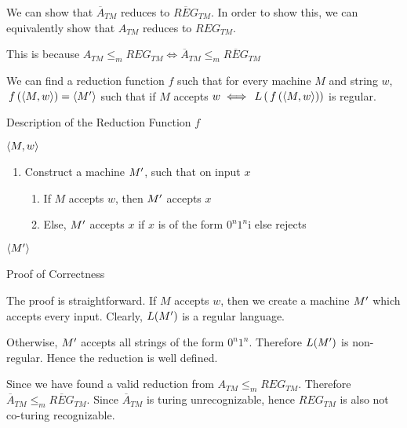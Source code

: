 \documentclass{article}
\begin{document}
\begin{question}

	We can show that $\overline{A}_{TM}$ reduces to $\overline{REG}_{TM}$. In order to show this, we can equivalently show that $A_{TM}$ reduces to $REG_{TM}$. \br%

	This is because $A_{TM} \le _m REG_{TM} \iff \overline{A}_{TM} \le _m \overline{REG}_{TM}$ \br%

	We can find a reduction function $f$ such that for every machine $M$ and string $w$, $\func{f}{\angl{M, w}} = \angl{\pr{M}}$ such that if $M$ accepts $w \iff \func{L}{\func{f}{\angl{M, w}}}$ is regular.

	\begin{qsubsection}{Description of the Reduction Function $f$}

		 $\left\langle M, w \right\rangle$
		\begin{enumerate}[label = (\alph*) ]
			\item Construct a machine $M^{\prime}$, such that on input $x$
				\begin{enumerate}[label = (\roman*)]
					\item If $M$ accepts $w$, then $M^{\prime}$ accepts $x$
					\item Else, $M^{\prime}$ accepts $x$ if $x$ is of the form $0^n 1^n$i else rejects
				\end{enumerate}
		\end{enumerate}
		 $\left\langle M^{\prime} \right\rangle$

	\end{qsubsection}

	\begin{qsubsection}{Proof of Correctness}

		The proof is straightforward. If $M$ accepts $w$, then we create a machine $M^{\prime}$ which accepts every input. Clearly, $L(M^{\prime})$ is a regular language. \br%

		Otherwise, $M^{\prime}$ accepts all strings of the form $0^n 1^n$. Therefore $L(M^{\prime})$ is non-regular. Hence the reduction is well defined.

	\end{qsubsection}

	Since we have found a valid reduction from $A_{TM} \le _m REG_{TM}$. Therefore $\overline{A}_{TM} \le _m \overline{REG}_{TM}$. Since $\overline{A}_{TM}$ is turing unrecognizable, hence $REG_{TM}$ is also not co-turing recognizable.

\end{question}
\end{document}
